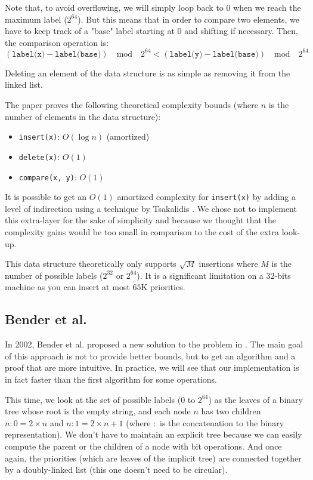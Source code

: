 \documentclass[12pt]{article}
\begin{document}
Note that, to avoid overflowing, we will simply loop back to 0 when we reach the maximum label ($2^{64}$).
But this means that in order to compare two elements, we have to keep track of a "base" label starting at 0 and shifting if necessary.
Then, the comparison operation is:
$$ (\texttt{label(x)} - \texttt{label(base)}) \quad \text{mod} \quad 2^{64} < (\texttt{label(y)} - \texttt{label(base)}) \quad \text{mod} \quad 2^{64} $$

Deleting an element of the data structure is as simple as removing it from the linked list.

The paper proves the following theoretical complexity bounds (where $n$ is the number of elements in the data structure):
\begin{itemize}
  \item \texttt{insert(x)}: $O(\log n)$ (amortized)
  \item \texttt{delete(x)}: $O(1)$
  \item \texttt{compare(x, y)}: $O(1)$
\end{itemize}

It is possible to get an $O(1)$ amortized complexity for \texttt{insert(x)} by adding a level of indirection using a technique by Tsakalidis \cite{10.1007/BFb0036494}. We chose not to implement this extra-layer for the sake of simplicity and because we thought that the complexity gains would be too small in comparison to the cost of the extra look-up.

This data structure theoretically only supports $\sqrt{M}$ insertions where $M$ is the number of possible labels ($2^{32}$ or $2^{64}$). It is a significant limitation on a $32$-bits machine as you can insert at most $65$K priorities.

\subsection{Bender et al.}

In 2002, Bender et al. proposed a new solution to the problem in \cite{10.5555/647912.740822}. The main goal of this approach is not to provide better bounds, but to get an algorithm and a proof that are more intuitive. In practice, we will see that our implementation is in fact faster than the first algorithm for some operations.

This time, we look at the set of possible labels ($0$ to $2^{64}$) as the leaves of a binary tree whose root is the empty string, and each node $n$ has two children $n:0 = 2 \times n$ and $n:1 = 2 \times n + 1$ (where $:$ is the concatenation to the binary representation).
We don't have to maintain an explicit tree because we can easily compute the parent or the children of a node with bit operations.
And once again, the priorities (which are leaves of the implicit tree) are connected together by a doubly-linked list (this one doesn't need to be circular).
\end{document}

